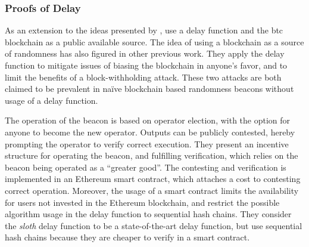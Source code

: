 \subsubsection{Proofs of Delay}%
\label{ssub:proofs_of_delay}

As an extension to the ideas presented by \citet{randomzoo}, \citet{bunz2017proofsof} use a delay function and the \gls{btc} blockchain as a public available source. The idea of using a blockchain as a source of randomness has also figured in other previous work.
They apply the delay function to mitigate issues of biasing the blockchain in anyone's favor, and to limit the benefits of a block-withholding attack.
These two attacks are both claimed to be prevalent in naïve blockchain based randomness beacons without usage of a delay function.

The operation of the beacon is based on operator election, with the option for anyone to become the new operator.
Outputs can be publicly contested, hereby prompting the operator to verify correct execution.
They present an incentive structure for operating the beacon, and fulfilling verification, which relies on the beacon being operated as a \enquote{greater good}.
The contesting and verification is implemented in an Ethereum smart contract, which attaches a cost to contesting correct operation.
Moreover, the usage of a smart contract limits the availability for users not invested in the Ethereum blockchain, and restrict the possible algorithm usage in the delay function to sequential hash chains.
They consider the \textit{sloth} delay function to be a state-of-the-art delay function, but use sequential hash chains because they are cheaper to verify in a smart contract.
